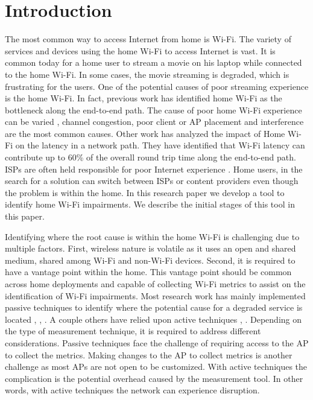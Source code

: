 \section{Introduction}\label{Introduction}

The most common way to access Internet from home is Wi-Fi. The variety of services and devices using the home Wi-Fi to access Internet is vast. It is common today for a home user to stream a movie on his laptop while connected to the home Wi-Fi. In some cases, the movie streaming is degraded, which is frustrating for the users. One of the potential causes of poor streaming experience is the home Wi-Fi. In fact, previous work \cite{homeoraccesslink} has identified home Wi-Fi as the bottleneck along the end-to-end path. The cause of poor home Wi-Fi experience can be varied \cite{wislow}, channel congestion, poor client or AP placement and interference are the most common causes. Other work \cite{wifi_weakest_link} has analyzed the impact of Home Wi-Fi on the latency in a network path. They have identified that Wi-Fi latency can contribute up to 60\% of the overall round trip time along the end-to-end path. ISPs are often held responsible for poor Internet experience \cite{predicting_effect_Home_Wifi}. Home users, in the search for a solution can switch between ISPs or content providers even though the problem is within the home. In this research paper we develop a tool to identify home Wi-Fi impairments. We describe the initial stages of this tool in this paper. 

Identifying where the root cause is within the home Wi-Fi is challenging due to multiple factors. First, wireless nature is volatile as it uses an open and shared medium, shared among Wi-Fi and non-Wi-Fi devices. Second, it is required to have a vantage point within the home. This vantage point should be common across home deployments and capable of collecting Wi-Fi metrics to assist on the identification of Wi-Fi impairments. Most research work has mainly implemented passive techniques to identify where the potential cause for a degraded service is located \cite{hostview}, \cite{passive_wifi_capacity_estimation}, \cite{observing_through_wifi_APs}. A couple others have relied upon active techniques \cite{can_user_level_probing}, \cite{WLAN_Troubleshooting}. Depending on the type of measurement technique, it is required to address different considerations. Passive techniques face the challenge of requiring access to the AP to collect the metrics. Making changes to the AP to collect metrics is another challenge as most APs are not open to be customized. With active techniques the complication is the potential overhead caused by the measurement tool. In other words, with active techniques the network can experience disruption. 

